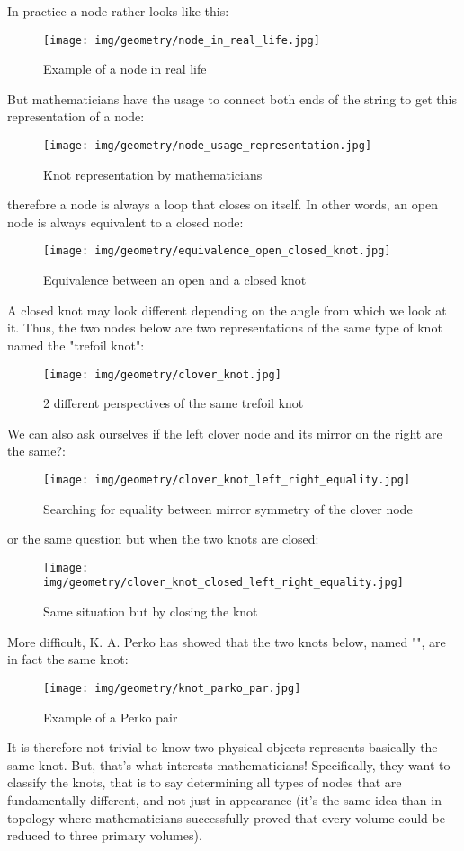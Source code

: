 {	In practice a node rather looks like this:
	\begin{figure}[H]
		\centering
		\texttt{[image: img/geometry/node\_in\_real\_life.jpg]}
		\caption{Example of a node in real life}
	\end{figure}
	But mathematicians have the usage to connect both ends of the string to get this representation of a node:
	\begin{figure}[H]
		\centering
		\texttt{[image: img/geometry/node\_usage\_representation.jpg]}
		\caption{Knot representation by mathematicians}
	\end{figure}
	therefore a node is always a loop that closes on itself. In other words, an open node is always equivalent to a closed node:
	\begin{figure}[H]
		\centering
		\texttt{[image: img/geometry/equivalence\_open\_closed\_knot.jpg]}
		\caption{Equivalence between an open and a closed knot}
	\end{figure}
	A closed knot may look different depending on the angle from which we look at it. Thus, the two nodes below are two representations of the same type of knot named the "trefoil knot":
	\begin{figure}[H]
		\centering
		\texttt{[image: img/geometry/clover\_knot.jpg]}
		\caption{2 different perspectives of the same trefoil knot}
	\end{figure}
	We can also ask ourselves if the left clover node and its mirror on the right are the same?:
	\begin{figure}[H]
		\centering
		\texttt{[image: img/geometry/clover\_knot\_left\_right\_equality.jpg]}
		\caption{Searching for equality between mirror symmetry of the clover node}
	\end{figure}
	or the same question but when the two knots are closed:
	\begin{figure}[H]
		\centering
		\texttt{[image: img/geometry/clover\_knot\_closed\_left\_right\_equality.jpg]}
		\caption{Same situation but by closing the knot}
	\end{figure}
	More difficult, K. A. Perko has showed that the two knots below, named "", are in fact the same knot:
	\begin{figure}[H]
		\centering
		\texttt{[image: img/geometry/knot\_parko\_par.jpg]}
		\caption{Example of a Perko pair}
	\end{figure}
	It is therefore not trivial to know two physical objects represents basically the same knot. But, that's what interests mathematicians! Specifically, they want to classify the knots, that is to say determining all types of nodes that are fundamentally different, and not just in appearance (it's the same idea than in topology where mathematicians successfully proved that every volume could be reduced to three primary volumes).
	
}
